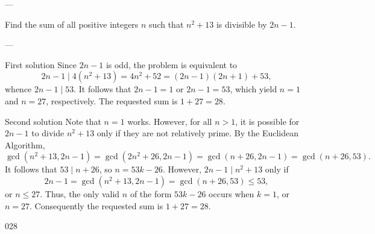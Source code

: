 
---

Find the sum of all positive integers $n$ such that $n^2+13$ is divisible by $2n-1$.

---

\begin{customenv}{First solution}
    Since $2n-1$ is odd, the problem is equivalent to \[2n-1\mid 4(n^2+13)=4n^2+52=(2n-1)(2n+1)+53,\]
    whence $2n-1\mid 53$. It follows that $2n-1=1$ or $2n-1=53$, which yield $n=1$ and $n=27$, respectively. The requested sum is $1+27=28$.
\end{customenv}
\begin{customenv}{Second solution}
    Note that $n=1$ works. However, for all $n>1$, it is possible for $2n-1$ to divide $n^2+13$ only if they are not relatively prime. By the Euclidean Algorithm, \[\gcd(n^2+13,2n-1)=\gcd(2n^2+26,2n-1)=\gcd(n+26,2n-1)=\gcd(n+26,53).\]
    It follows that $53\mid n+26$, so $n=53k-26$. However, $2n-1\mid n^2+13$ only if \[2n-1=\gcd(n^2+13,2n-1)=\gcd(n+26,53)\le 53,\]
    or $n\le 27$. Thus, the only valid $n$ of the form $53k-26$ occurs when $k=1$, or $n=27$. Consequently the requested sum is $1+27=28$.
\end{customenv}

028
